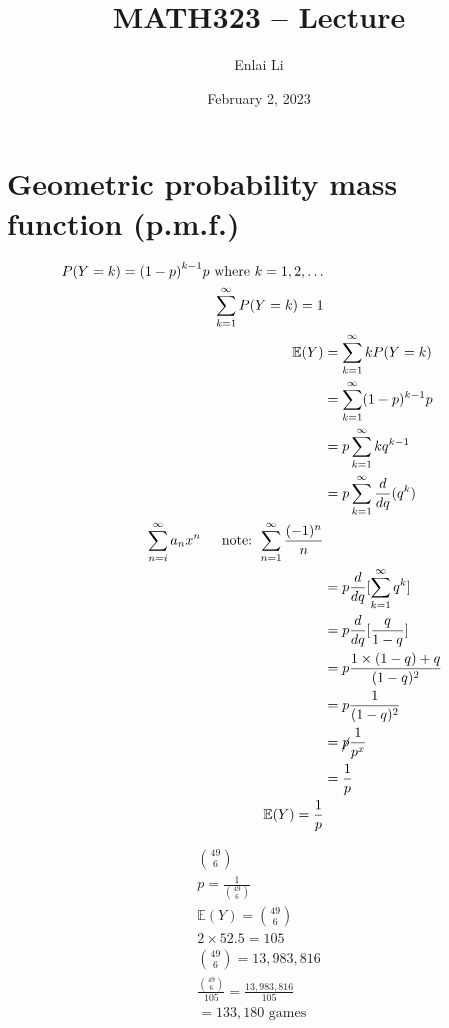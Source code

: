 \documentclass{article}
\author{Enlai Li}
\title{MATH323 -- Lecture }
\date{February 2, 2023}
\begin{document}
\maketitle
\section{Geometric probability mass function (p.m.f.)}
\begin{align*}
    P(Y=k) = {(1-p)}^{k-1}p          \text{ where } k = 1, 2, \dots                         \\
    \sum_{k=1}^{\infty} P(Y=k) = 1                                                          \\
    \mathbb{E}(Y) & = \sum_{k=1}^{\infty} kP(Y=k)                                           \\
                  & = \sum_{k=1}^{\infty} (1-p)^{k-1}p                                      \\
                  & = p \sum_{k=1}^{\infty} kq^{k-1}                                        \\
                  & = p \sum_{k=1}^{\infty} \frac{d}{dq}(q^k)                               \\
    \sum_{n=i}^{\infty}a_nx ^{n} \text{\indent note: } \sum_{n=1}^{\infty} \frac{(-1)^n}{n} \\
                  & = p \frac{d}{dq}[\sum_{k=1}^{\infty} q^k]                               \\
                  & = p \frac{d}{dq}[\frac{q}{1-q}]                                         \\
                  & = p \frac{1 \times (1-q) + q}{(1-q)^2}                                  \\
                  & = p \frac{1 }{(1-q)^2}                                                  \\
                  & = \cancel{p} \frac{1}{p^x}                                              \\
                  & = \frac{1}{p}                                                           \\
    \mathbb{E}(Y) = \frac{1}{p}
\end{align*}

\begin{align*}
    \binom{49}{6}                                      \\
    p = \frac{1}{\binom{49}{6}}                        \\
    \mathbb{E}(Y) = \binom{49}{6}                      \\
    2 \times 52.5 = 105                                \\
    \binom{49}{6} = 13,983,816                         \\
    \frac{\binom{49}{6}}{105} = \frac{13,983,816}{105} \\
    = 133,180 \text{ games}
\end{align*}
\end{document}
